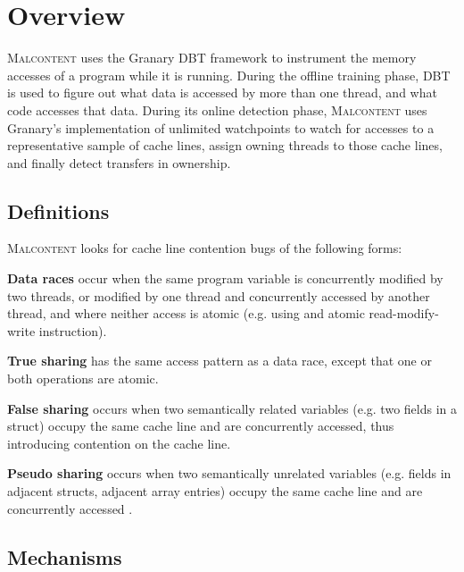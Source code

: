 \documentclass[letterpaper,twocolumn,10pt]{article}
\newcommand{\TextToolname}{Malcontent}
\newcommand{\Toolname}{\textsc{\TextToolname{}}}
\begin{document}


\section{Overview}\label{sec:overview}

\Toolname{} uses the Granary DBT \cite{Granary} framework to instrument the memory accesses of a program while
it is running. During the offline training phase, DBT is used to figure out what data is accessed by more than one thread,
and what code accesses that data. During its online detection phase, \Toolname{} uses Granary's implementation of unlimited
watchpoints to watch for accesses to a representative sample of cache lines, assign owning threads to those cache lines,
and finally detect transfers in ownership.

\subsection{Definitions}
\Toolname{} looks for cache line contention bugs of the following forms:

{\bf Data races} occur when the same program variable is concurrently modified by two threads, or 
modified by one thread and concurrently accessed by another thread, and where neither access is atomic (e.g. using
and atomic read-modify-write instruction).

{\bf True sharing} has the same access pattern as a data race, except that one or both operations
are atomic.

{\bf False sharing} occurs when two semantically related variables (e.g. two fields in a struct) occupy
the same cache line and are concurrently accessed, thus introducing contention on the cache line.

{\bf Pseudo sharing} occurs when two semantically unrelated variables (e.g. fields in adjacent structs,
adjacent array entries) occupy the same cache line and are concurrently accessed \cite{DegenerateSharingAndFalseCoherence}.

\subsection{Mechanisms}

\end{document}
